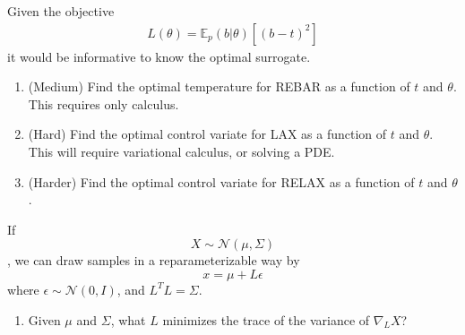 \documentclass{harvardml}
\newcommand{\distNorm}{\mathcal{N}}
\newcommand{\E}{\mathbb{E}}
\theoremstyle{plain}
\begin{document}
\begin{problem}

Given the objective
%
\begin{align}
L(\theta) = \E_p(b|\theta) \left[ (b - t)^2 \right]
\end{align}
%
it would be informative to know the optimal surrogate.

\begin{enumerate}[label=(\alph*)]
\item (Medium) Find the optimal temperature for REBAR as a function of $t$ and $\theta$.
This requires only calculus.
\item (Hard) Find the optimal control variate for LAX as a function of $t$ and $\theta$.
This will require variational calculus, or solving a PDE.
\item (Harder) Find the optimal control variate for RELAX as a function of $t$ and $\theta$.
\end{enumerate}
\end{problem}







\begin{problem}

If $$X \sim \distNorm(\mu, \Sigma)$$, we can draw samples in a reparameterizable way by $$x = \mu + L \epsilon$$ where $\epsilon \sim \distNorm(0, I)$, and $L^T L = \Sigma$.

\begin{enumerate}[label=(\alph*)]
\item Given $\mu$ and $\Sigma$, what $L$ minimizes the trace of the variance of $\nabla_L X$?
\end{enumerate}
\end{problem}



\end{document}
